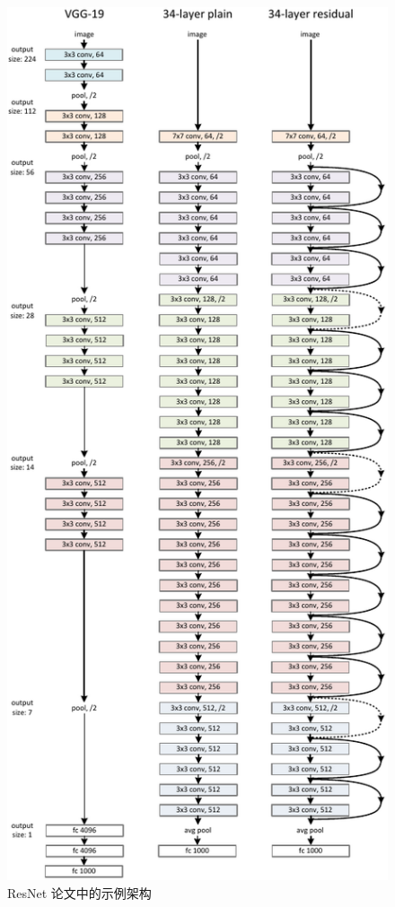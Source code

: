\documentclass[../../main.tex]{subfiles}
\begin{document}
\begin{refsection}
\begin{figure}[p]
    \centering
    \includegraphics[height=\textheight]{./img/resnet-arch.pdf}
    \caption{ResNet 论文中的示例架构}
\end{figure}


\end{refsection}
\end{document}
